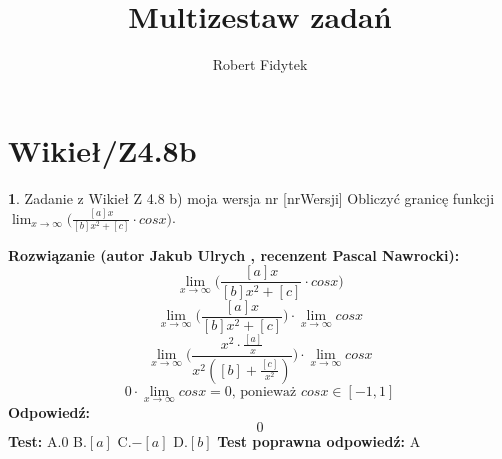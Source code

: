 \documentclass[12pt, a4paper]{article}
\title{Multizestaw zadań}
\author{Robert Fidytek}
\date{}
\theoremstyle{definition} %
\newtheorem{zad}{}
\newcommand{\kategoria}[1]{\section{#1}} %
\newcommand{\zadStart}[1]{\begin{zad}#1\newline} %
\newcommand{\zadStop}{\end{zad}}   %
\newcommand{\rozwStart}[2]{\noindent \textbf{Rozwiązanie (autor #1 , recenzent #2): }\newline} %
\newcommand{\rozwStop}{\newline}                                            %
\newcommand{\odpStart}{\noindent \textbf{Odpowiedź:}\newline}    %
\newcommand{\odpStop}{\newline}                                             %
\newcommand{\testStart}{\noindent \textbf{Test:}\newline} %
\newcommand{\testStop}{\newline} %
\newcommand{\kluczStart}{\noindent \textbf{Test poprawna odpowiedź:}\newline} %
\newcommand{\kluczStop}{\newline} %
\begin{document}
\maketitle


\kategoria{Wikieł/Z4.8b}
\zadStart{Zadanie z Wikieł Z 4.8 b) moja wersja nr [nrWersji]}
Obliczyć granicę funkcji $\lim_{x \to \infty}\bigg(\frac{[a]x}{[b]x^{2}+[c]}\cdot cosx\bigg)$.
\zadStop
\rozwStart{Jakub Ulrych}{Pascal Nawrocki}
$$\lim_{x \to \infty}\bigg(\frac{[a]x}{[b]x^{2}+[c]}\cdot cosx\bigg)$$
$$\lim_{x \to \infty}\bigg(\frac{[a]x}{[b]x^{2}+[c]}\bigg)\cdot \lim_{x \to \infty}cosx$$
$$\lim_{x \to \infty}\bigg(\frac{x^{2}\cdot\frac{[a]}{x}}{x^{2}([b]+\frac{[c]}{x^{2}})}\bigg)\cdot \lim_{x \to \infty}cosx$$
$$0\cdot \lim_{x \to \infty}cosx=0 \text{, ponieważ }cosx\in [-1,1]$$
\rozwStop
\odpStart
$$0$$
\odpStop
\testStart
A.$0$
B.$[a]$
C.$-[a]$
D.$[b]$
\testStop
\kluczStart
A
\kluczStop
\end{document}
